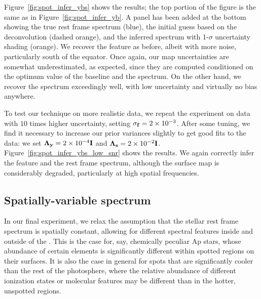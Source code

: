 \documentclass[modern]{aastex631}
\begin{document}
Figure~\ref{fig:spot_infer_ybs} shows the results; 
the top portion of the figure is the same as in Figure~\ref{fig:spot_infer_yb}.
A panel has been added at the bottom showing the true rest frame spectrum (blue), the initial guess based on the deconvolution (dashed orange), and the inferred spectrum with 1-$\sigma$ uncertainty shading (orange). 
We recover the \spot feature as before, albeit with more noise, particularly south of the equator. 
Once again, our map uncertainties are somewhat underestimated, as expected, since they are computed conditioned on the optimum value of the baseline and the spectrum. 
On the other hand, we recover the spectrum exceedingly well, with low uncertainty and virtually no bias anywhere.

To test our technique on more realistic data, we repeat the experiment on data with $10$ times higher uncertainty, setting $\sigma_{\mathbf{f}} = 2\times 10^{-3}$.
%
After some tuning, we find it necessary to increase our prior variances slightly to get good fits to the data: we set $\boldsymbol{\Lambda}_{\mathbf{y}} = 2\times 10^{-4} {\mathbf{I}}$ and $\boldsymbol{\Lambda}_{\mathbf{s}} = 2\times 10^{-2}{\mathbf{I}}$.
%
Figure~\ref{fig:spot_infer_ybs_low_snr} shows the results. We again correctly infer the \spot feature and the rest frame spectrum, although the surface map is considerably degraded, particularly at high spatial frequencies.

\subsection{Spatially-variable spectrum}
\label{sec:twospec}
%
In our final experiment, we relax the assumption that the stellar rest frame spectrum is spatially constant, allowing for different spectral features inside and outside of the \spot. 
This is the case for, say, chemically peculiar Ap stars, whose abundance of certain elements is significantly different within spotted regions on their surfaces. 
It is also the case in general for spots that are significantly cooler than the rest of the photosphere, where the relative abundance of different ionization states or molecular features may be different than in the hotter, unspotted regions.
\end{document}
